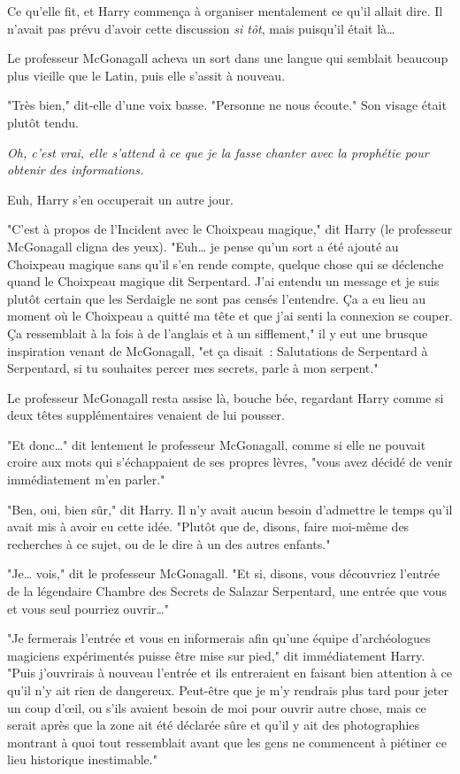 Ce qu'elle fit, et Harry commença à organiser mentalement ce qu'il allait dire. Il n'avait pas prévu d'avoir cette discussion \emph{si tôt}, mais puisqu'il était là…

Le professeur McGonagall acheva un sort dans une langue qui semblait beaucoup plus vieille que le Latin, puis elle s'assit à nouveau.

"Très bien," dit-elle d'une voix basse. "Personne ne nous écoute." Son visage était plutôt tendu.

\emph{Oh, c'est vrai, elle s'attend à ce que je la fasse chanter avec la prophétie pour obtenir des informations.}

Euh, Harry s'en occuperait un autre jour.

"C'est à propos de l'Incident avec le Choixpeau magique," dit Harry (le professeur McGonagall cligna des yeux). "Euh… je pense qu'un sort a été ajouté au Choixpeau magique sans qu'il s'en rende compte, quelque chose qui se déclenche quand le Choixpeau magique dit Serpentard. J'ai entendu un message et je suis plutôt certain que les Serdaigle ne sont pas censés l'entendre. Ça a eu lieu au moment où le Choixpeau a quitté ma tête et que j'ai senti la connexion se couper. Ça ressemblait à la fois à de l'anglais et à un sifflement," il y eut une brusque inspiration venant de McGonagall, "et ça disait~: Salutations de Serpentard à Serpentard, si tu souhaites percer mes secrets, parle à mon serpent."

Le professeur McGonagall resta assise là, bouche bée, regardant Harry comme si deux têtes supplémentaires venaient de lui pousser.

"Et donc…" dit lentement le professeur McGonagall, comme si elle ne pouvait croire aux mots qui s'échappaient de ses propres lèvres, "vous avez décidé de venir immédiatement m'en parler."

"Ben, oui, bien sûr," dit Harry. Il n'y avait aucun besoin d'admettre le temps qu'il avait mis à avoir eu cette idée. "Plutôt que de, disons, faire moi-même des recherches à ce sujet, ou de le dire à un des autres enfants."

"Je… vois," dit le professeur McGonagall. "Et si, disons, vous découvriez l'entrée de la légendaire Chambre des Secrets de Salazar Serpentard, une entrée que vous et vous seul pourriez ouvrir…"

"Je fermerais l'entrée et vous en informerais afin qu'une équipe d'archéologues magiciens expérimentés puisse être mise sur pied," dit immédiatement Harry. "Puis j'ouvrirais à nouveau l'entrée et ils entreraient en faisant bien attention à ce qu'il n'y ait rien de dangereux. Peut-être que je m'y rendrais plus tard pour jeter un coup d'œil, ou s'ils avaient besoin de moi pour ouvrir autre chose, mais ce serait après que la zone ait été déclarée sûre et qu'il y ait des photographies montrant à quoi tout ressemblait avant que les gens ne commencent à piétiner ce lieu historique inestimable."

